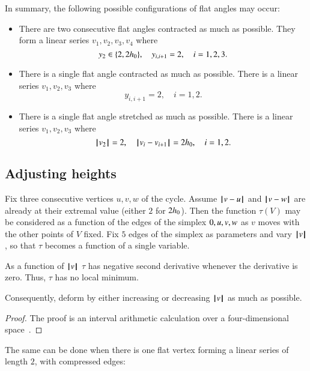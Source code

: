In summary,  the following possible configurations of flat angles may occur:
\begin{itemize}
\item There are two consecutive flat angles contracted as much as possible.  They form a linear series $v_1,v_2,v_3,v_4$ where
$$
y_2\in\{2,2{h_0}\},\quad
y_{i,i+1}=2,\quad i=1,2,3.
$$
\item There is a single flat angle contracted as much as possible.  There
is a linear series $v_1,v_2,v_3$ where
$$
y_{i,i+1}=2,\quad i=1,2.
$$
\item There is a single flat angle stretched as much as possible.  There
is a linear series $v_1,v_2,v_3$ where
$$
{{\hskip0.1em|\hskip-0.15em|\hskip0.1em}v_2{\hskip0.1em|\hskip-0.15em|\hskip0.1em}}=2,\quad
{\hskip0.1em|\hskip-0.15em|\hskip0.1em}v_i - v_{i+1}{\hskip0.1em|\hskip-0.15em|\hskip0.1em}=2{h_0},\quad i=1,2.
$$
\end{itemize}


\subsection{Adjusting heights}

Fix three consecutive vertices $u,v,w$ of the cycle.
Assume ${\hskip0.1em|\hskip-0.15em|\hskip0.1em}v - u{\hskip0.1em|\hskip-0.15em|\hskip0.1em}$ and ${\hskip0.1em|\hskip-0.15em|\hskip0.1em}v - w{\hskip0.1em|\hskip-0.15em|\hskip0.1em}$ are already at their extremal value (either $2$ for  $2{h_0}$).  Then the function $\tau(V)$ may be considered as a function
of the edges of the simplex $0,u,v,w$ as $v$ moves with the other points of $V$ fixed.  Fix $5$ edges of the simplex as parameters and vary ${{\hskip0.1em|\hskip-0.15em|\hskip0.1em}v{\hskip0.1em|\hskip-0.15em|\hskip0.1em}}$, so that $\tau$ becomes a function of a single variable.

\begin{lemma} As a function of ${{\hskip0.1em|\hskip-0.15em|\hskip0.1em}v{\hskip0.1em|\hskip-0.15em|\hskip0.1em}}$
 $\tau$ has negative second derivative whenever the derivative is zero.  Thus, $\tau$ has no local minimum.
\end{lemma}

Consequently,  deform by either increasing or decreasing ${{\hskip0.1em|\hskip-0.15em|\hskip0.1em}v{\hskip0.1em|\hskip-0.15em|\hskip0.1em}}$ as much as possible.  

\begin{proof}
The proof is an interval arithmetic calculation over a four-dimensional space~\cite[cc:d2a]{hales:2009:nonlinear}.  %
\end{proof}


The same can be done when there is one flat vertex forming a linear series of length $2$, with compressed edges:

